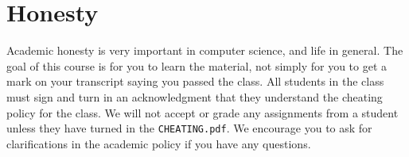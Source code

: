 \section{Honesty}

Academic honesty is very important in computer science, and life in general. The
goal of this course is for you to learn the material, not simply for you to get
a mark on your transcript saying you passed the class. All students in the class
must sign and turn in an acknowledgment that they understand the cheating policy
for the class. We will not accept or grade any assignments from a student unless
they have turned in the \texttt{CHEATING.pdf}. We encourage you to ask for
clarifications in the academic policy if you have any questions.
